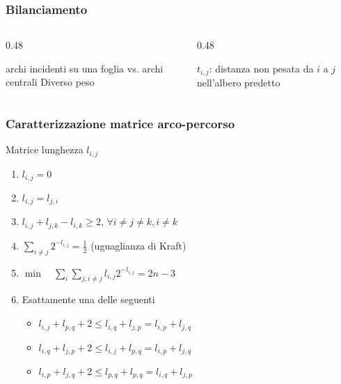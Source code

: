 \begin{frame}
    \frametitle{Bilanciamento}
    \begin{columns}
        \begin{column}{0.48\textwidth}
            \begin{block}{archi incidenti su una foglia vs.
                    archi centrali}
                Diverso peso
            \end{block}
        \end{column}
        \begin{column}{0.48\textwidth}

            $t_{i,j}$: distanza non pesata da $i$ a $j$ nell'albero predetto

        \end{column}
    \end{columns}
\end{frame}

\begin{frame}
    \frametitle{Caratterizzazione matrice arco-percorso}
    \begin{block}{Matrice lunghezza $l_{i,j}$}
        \begin{enumerate}
            \item $l_{i,j} = 0$
            \item $l_{i,j} = l_{j,i}$
            \item $l_{i,j} + l_{j,k} - l_{i,k} \geq  2$, $\forall i\ne j\ne k, i\neq k$
                        \item $\sum_{i\ne j} 2^{-l_{i,j}} = \frac{1}{2}$ \hspace{1em}(uguaglianza di Kraft)
            \item     $\min\quad \sum_{i} \sum_{j, i\ne j} l_{i,j} 2^{- l_{i,j}} = 2n -3$
            \item Esattamente una delle seguenti
                  \begin{itemize}
                      \item $l_{i,j} + l_{p,q} + 2 \le l_{i,q} + l_{{j,p}}  = l_{i,p} + l_{{j,q}} $
                      \item $l_{i,q} + l_{j,p} + 2 \le l_{i,j} + l_{{p,q}}  = l_{i,p} + l_{{j,q}} $
                      \item $l_{i,p} + l_{j,q} + 2 \le l_{p,q} + l_{{p,q}}  = l_{i,q} + l_{{j,p}} $
                  \end{itemize}
        \end{enumerate}
    \end{block}
\end{frame}


